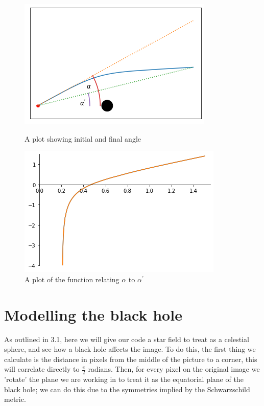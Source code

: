 \documentclass[oneside,openright,frontopenright, singlespacing]{dmathesis}
\begin{document}
\begin{figure}[!ht]
	\centering
	\begin{minipage}{0.5\textwidth}
		\centering
		\includegraphics[height=0.5\linewidth]{img/alpha_alpha-prime}
		\caption{A plot showing initial and final angle}
	\end{minipage}%
	\hfill
	\begin{minipage}{0.5\textwidth}
		\centering
		\includegraphics[height=0.5\linewidth]{img/alpha-prime_f(alpha)}
		\caption{A plot of the function relating $\alpha$ to $\alpha^{'}$}
	\end{minipage}
\end{figure}

\section{Modelling the black hole}
	
	As outlined in 3.1, here we will give our code a star field to treat as a celestial sphere, and see how a black hole affects the image. To do this, the first thing we calculate is the distance in pixels from the middle of the picture to a corner, this will correlate directly to $\frac{\pi}{2}$ radians. Then, for every pixel on the original image we 'rotate' the plane we are working in to treat it as the equatorial plane of the black hole; we can do this due to the symmetries implied by the Schwarzschild metric. 
\end{document}
